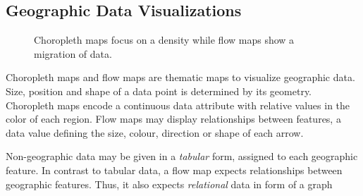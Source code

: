 \subsection{Geographic Data Visualizations}

\begin{figure}
  \centering
  \caption{Choropleth maps focus on a density while flow maps show a migration of data.}%
  \label{fig:analysis:geographical}
  \qquad
\end{figure}

Choropleth maps and flow maps are thematic maps to visualize geographic data.
Size, position and shape of a data point is determined by its geometry.
Choropleth maps encode a continuous data attribute with relative values in the color of each region.
Flow maps may display relationships between features, a data value defining the size, colour, direction or shape of each arrow.

Non-geographic data may be given in a \emph{tabular} form, assigned to each geographic feature.
In contrast to tabular data, a flow map expects relationships between geographic features.
Thus, it also expects \emph{relational} data in form of a graph


